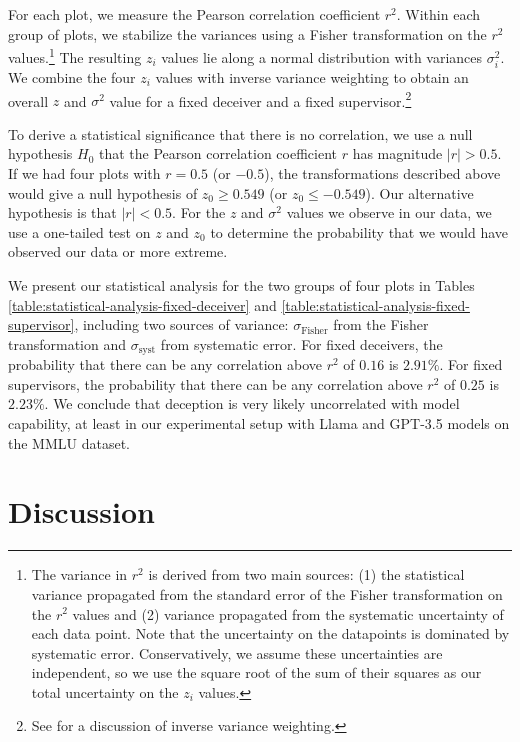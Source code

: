 \documentclass[11pt]{article}
\begin{document}
For each plot, we measure the Pearson correlation coefficient $r^2$. Within each group of plots, we stabilize the variances using a Fisher transformation on the $r^2$ values.\footnote{The variance in $r^2$ is derived from two main sources: (1) the statistical variance propagated from the standard error of the Fisher transformation on the $r^2$ values and (2) variance propagated from the systematic uncertainty of each data point. Note that the uncertainty on the datapoints is dominated by systematic error. Conservatively, we assume these uncertainties are independent, so we use the square root of the sum of their squares as our total uncertainty on the $z_i$ values.} The resulting $z_i$ values lie along a normal distribution with variances $\sigma_i^2$. We combine the four $z_i$ values with inverse variance weighting to obtain an overall $z$ and $\sigma^2$ value for a fixed deceiver and a fixed supervisor.\footnote{See \cite{lee2016varianceweighted} for a discussion of inverse variance weighting.}

To derive a statistical significance that there is no correlation, we use a null hypothesis $H_0$ that the Pearson correlation coefficient $r$ has magnitude $|r| > 0.5$. If we had four plots with $r = 0.5$ (or $-0.5$), the transformations described above would give a null hypothesis of $z_0 \geq 0.549$ (or $z_0 \leq -0.549$). Our alternative hypothesis is that $|r| < 0.5$. For the $z$ and $\sigma^2$ values we observe in our data, we use a one-tailed test on $z$ and $z_0$ to determine the probability that we would have observed our data or more extreme.

We present our statistical analysis for the two groups of four plots in Tables \ref{table:statistical-analysis-fixed-deceiver} and \ref{table:statistical-analysis-fixed-supervisor}, including two sources of variance: $\sigma_\text{Fisher}$ from the Fisher transformation and $\sigma_\text{syst}$ from systematic error. For fixed deceivers, the probability that there can be any correlation above $r^2$ of $0.16$ is $2.91\%$. For fixed supervisors, the probability that there can be any correlation above $r^2$ of $0.25$ is $2.23\%$. We conclude that deception is very likely uncorrelated with model capability, at least in our experimental setup with Llama and GPT-3.5 models on the MMLU dataset.

\section{Discussion}
\end{document}
